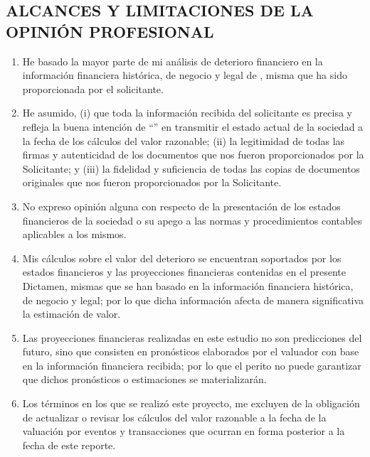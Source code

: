 \subsection{ALCANCES Y LIMITACIONES DE LA OPINIÓN PROFESIONAL}

\begin{enumerate}[\indent 1.]

\item He basado la mayor parte de mi análisis de deterioro financiero en la información financiera histórica, de negocio y legal de \textcolor{principal}{\empresaSolicitante}, misma que ha sido proporcionada por el solicitante.

\item He asumido, (i) que toda la información recibida del solicitante es precisa y refleja la buena intención de ``\textcolor{principal}{\empresaCorto}'' en transmitir el estado actual de la sociedad a la fecha de los cálculos del valor razonable; (ii) la legitimidad de todas las firmas y autenticidad de los documentos que nos fueron proporcionados por la Solicitante; y (iii) la fidelidad y suficiencia de todas las copias de documentos originales que nos fueron proporcionados por la Solicitante.

\item No expreso opinión alguna con respecto de la presentación de los estados financieros de la sociedad o su apego a las normas y procedimientos contables aplicables a los mismos.

\item Mis cálculos sobre el valor del deterioro se encuentran soportados por los estados financieros y las proyecciones financieras contenidas en el presente Dictamen, mismas que se han basado en la información financiera histórica, de negocio y legal; por lo que dicha información afecta de manera significativa la estimación de valor. 

\item Las proyecciones financieras realizadas en este estudio no son predicciones del futuro, sino que consisten en pronósticos elaborados por el valuador con base en la información financiera recibida; por lo que el perito no puede garantizar que dichos pronósticos o estimaciones se materializarán.

\item Los términos en los que se realizó este proyecto, me excluyen de la obligación de actualizar o revisar los cálculos del valor razonable a la fecha de la valuación por eventos y transacciones que ocurran en forma posterior a la fecha de este reporte. 


\end{enumerate}
